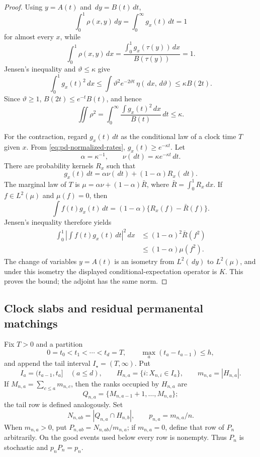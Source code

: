 \documentclass[11pt]{article}
\theoremstyle{remark}
\newcommand{\dd}{\,d}
\begin{document}
\begin{proof}
Using $y=A(t)$ and $\dd y=B(t)\dd t$,
\[
 \int_0^1\rho(x,y)\dd y=\int_0^\infty g_x(t)\dd t=1
\]
for almost every $x$, while
\[
 \int_0^1\rho(x,y)\dd x
 =\frac{\int_0^1g_x(\tau(y))\dd x}{B(\tau(y))}=1.
\]
Jensen's inequality and $\vartheta\le\kappa$ give
\[
 \int_0^1g_x(t)^2\dd x
 \le\int\vartheta^2e^{-2\vartheta t}\,
 \eta(\dd x,\dd\vartheta)
 \le\kappa B(2t).
\]
Since $\vartheta\ge1$, $B(2t)\le e^{-t}B(t)$, and hence
\[
 \iint\rho^2
 =\int_0^\infty\frac{\int g_x(t)^2\dd x}{B(t)}\dd t
 \le\kappa.
\]

For the contraction, regard $g_x(t)\dd t$ as the conditional law of a clock
time $T$ given $x$.  From \eqref{eq:pd-normalized-rates},
$g_x(t)\ge e^{-\kappa t}$.  Let
\[
        \alpha=\kappa^{-1},
        \qquad \nu(\dd t)=\kappa e^{-\kappa t}\dd t.
\]
There are probability kernels $R_x$ such that
\[
        g_x(t)\dd t=\alpha\nu(\dd t)+(1-\alpha)R_x(\dd t).
\]
The marginal law of $T$ is
$\mu=\alpha\nu+(1-\alpha)\bar R$, where
$\bar R=\int_0^1R_x\dd x$.  If $f\in L^2(\mu)$ and $\mu(f)=0$, then
\[
 \int f(t)g_x(t)\dd t
 =(1-\alpha)\{R_x(f)-\bar R(f)\}.
\]
Jensen's inequality therefore yields
\[
\begin{aligned}
 \int_0^1\left|\int f(t)g_x(t)\dd t\right|^2\dd x
 &\le(1-\alpha)^2\bar R(f^2)\\
 &\le(1-\alpha)\mu(f^2).
\end{aligned}
\]
The change of variables $y=A(t)$ is an isometry from $L^2(\dd y)$ to
$L^2(\mu)$, and under this isometry the displayed conditional-expectation
operator is $K$.  This proves the bound; the adjoint has the same norm.
\end{proof}

\subsection{Clock slabs and residual permanental matchings}

Fix $T>0$ and a partition
\[
        0=t_0<t_1<\cdots<t_d=T,
        \qquad \max_a(t_a-t_{a-1})\le h,
\]
and append the tail interval $I_\star=(T,\infty)$.  Put
\[
 I_a=(t_{a-1},t_a]\quad(a\le d),
 \qquad H_{n,a}=\{i:X_{n,i}\in I_a\},
 \qquad m_{n,a}=|H_{n,a}|.
\]
If $M_{n,a}=\sum_{c\le a}m_{n,c}$, then the ranks occupied by $H_{n,a}$ are
\[
        Q_{n,a}=\{M_{n,a-1}+1,\ldots,M_{n,a}\};
\]
the tail row is defined analogously.  Set
\[
 N_{n,ab}=|Q_{n,a}\cap H_{n,b}|,
 \qquad p_{n,a}=m_{n,a}/n.
\]
When $m_{n,a}>0$, put $P_{n,ab}=N_{n,ab}/m_{n,a}$; if
$m_{n,a}=0$, define that row of $P_n$ arbitrarily.  On the good events used
below every row is nonempty.  Thus $P_n$ is stochastic and $p_nP_n=p_n$.
\end{document}
